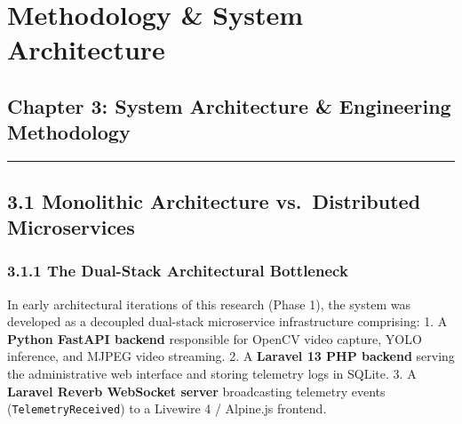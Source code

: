 \chapter{Methodology \& System
Architecture}\label{methodology-system-architecture}

\section{Chapter 3: System Architecture \& Engineering
Methodology}\label{chapter-3-system-architecture-engineering-methodology}

\begin{center}\rule{0.5\linewidth}{0.5pt}\end{center}

\section{3.1 Monolithic Architecture vs.~Distributed
Microservices}\label{monolithic-architecture-vs.-distributed-microservices}

\subsection{3.1.1 The Dual-Stack Architectural
Bottleneck}\label{the-dual-stack-architectural-bottleneck}

In early architectural iterations of this research (Phase 1), the system
was developed as a decoupled dual-stack microservice infrastructure
comprising: 1. A \textbf{Python FastAPI backend} responsible for OpenCV
video capture, YOLO inference, and MJPEG video streaming. 2. A
\textbf{Laravel 13 PHP backend} serving the administrative web interface
and storing telemetry logs in SQLite. 3. A \textbf{Laravel Reverb
WebSocket server} broadcasting telemetry events
(\texttt{TelemetryReceived}) to a Livewire 4 / Alpine.js frontend.

